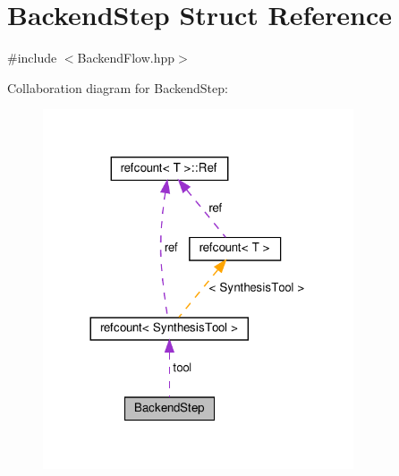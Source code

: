 \hypertarget{structBackendStep}{}\section{Backend\+Step Struct Reference}
\label{structBackendStep}


{\ttfamily \#include $<$Backend\+Flow.\+hpp$>$}



Collaboration diagram for Backend\+Step\+:
\nopagebreak
\begin{figure}[H]
\begin{center}
\leavevmode
\includegraphics[width=260pt]{df/dc2/structBackendStep__coll__graph}
\end{center}
\end{figure}
